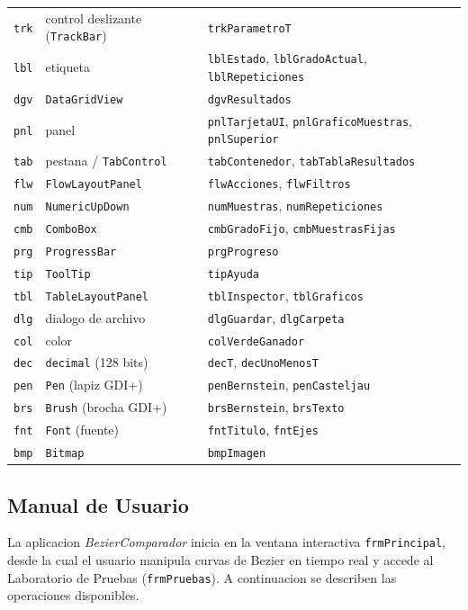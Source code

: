 \begin{table}[H]
\begin{tabular}{llp{7cm}}
\texttt{trk} & control deslizante (\texttt{TrackBar}) & \texttt{trkParametroT} \\
\texttt{lbl} & etiqueta & \texttt{lblEstado}, \texttt{lblGradoActual}, \texttt{lblRepeticiones} \\
\texttt{dgv} & \texttt{DataGridView} & \texttt{dgvResultados} \\
\texttt{pnl} & panel & \texttt{pnlTarjetaUI}, \texttt{pnlGraficoMuestras}, \texttt{pnlSuperior} \\
\texttt{tab} & pestana / \texttt{TabControl} & \texttt{tabContenedor}, \texttt{tabTablaResultados} \\
\texttt{flw} & \texttt{FlowLayoutPanel} & \texttt{flwAcciones}, \texttt{flwFiltros} \\
\texttt{num} & \texttt{NumericUpDown} & \texttt{numMuestras}, \texttt{numRepeticiones} \\
\texttt{cmb} & \texttt{ComboBox} & \texttt{cmbGradoFijo}, \texttt{cmbMuestrasFijas} \\
\texttt{prg} & \texttt{ProgressBar} & \texttt{prgProgreso} \\
\texttt{tip} & \texttt{ToolTip} & \texttt{tipAyuda} \\
\texttt{tbl} & \texttt{TableLayoutPanel} & \texttt{tblInspector}, \texttt{tblGraficos} \\
\texttt{dlg} & dialogo de archivo & \texttt{dlgGuardar}, \texttt{dlgCarpeta} \\
\texttt{col} & color & \texttt{colVerdeGanador} \\
\texttt{dec} & \texttt{decimal} (128 bits) & \texttt{decT}, \texttt{decUnoMenosT} \\
\texttt{pen} & \texttt{Pen} (lapiz GDI+) & \texttt{penBernstein}, \texttt{penCasteljau} \\
\texttt{brs} & \texttt{Brush} (brocha GDI+) & \texttt{brsBernstein}, \texttt{brsTexto} \\
\texttt{fnt} & \texttt{Font} (fuente) & \texttt{fntTitulo}, \texttt{fntEjes} \\
\texttt{bmp} & \texttt{Bitmap} & \texttt{bmpImagen} \\
\bottomrule
\end{tabular}
\end{table}

\subsection{Manual de Usuario}
\label{subsec:impl_manual}

La aplicacion \textit{BezierComparador} inicia en la ventana interactiva \texttt{frmPrincipal}, desde la cual el usuario manipula curvas de Bezier en tiempo real y accede al Laboratorio de Pruebas (\texttt{frmPruebas}). A continuacion se describen las operaciones disponibles.

